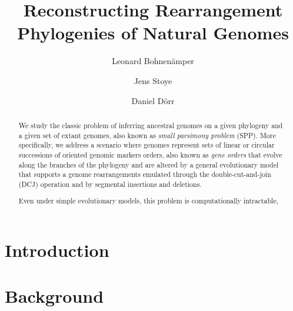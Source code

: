 \documentclass[runningheads]{llncs}
\begin{document}
%
\title{Reconstructing Rearrangement Phylogenies of Natural Genomes}
%
%
\author{Leonard Bohnen\"amper \and
    Jens Stoye  \and
    Daniel D\"orr 
}
%
%

%
\maketitle              %
%
\begin{abstract}
    We study the classic problem of inferring ancestral genomes on a given phylogeny and a given set of extant genomes, also known as \emph{small parsimony problem} (SPP). 
    More specifically, we address a scenario where genomes represent sets of linear or circular successions of oriented genomic markers orders, also known as \emph{gene orders} that evolve along the branches of the phylogeny and are altered by a general evolutionary model that supports a genome rearrangements emulated through the double-cut-and-join (DCJ) operation and by segmental insertions and deletions.

    Even under simple evolutionary models, this problem is computationally intractable, 


\end{abstract}
%
%
%

\section{Introduction}
\section{Background}
\end{document}
